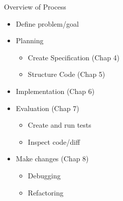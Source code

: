 \documentclass[
ps,
]{prosper}
\begin{document}
\begin{slide}{Overview of Process}

\begin{itemize}

\item Define problem/goal

\item Planning
  
  \begin{itemize}
    
  \item Create Specification (Chap 4)

  \item Structure Code (Chap 5)
    
  \end{itemize}

\item Implementation (Chap 6)

\item Evaluation (Chap 7)
  
  \begin{itemize}
    
  \item Create and run tests 

  \item Inspect code/diff
    
  \end{itemize}

\item Make changes (Chap 8)

  \begin{itemize}
    
  \item Debugging

  \item Refactoring
    
  \end{itemize}

\end{itemize}
  
\end{slide}
\end{document}
